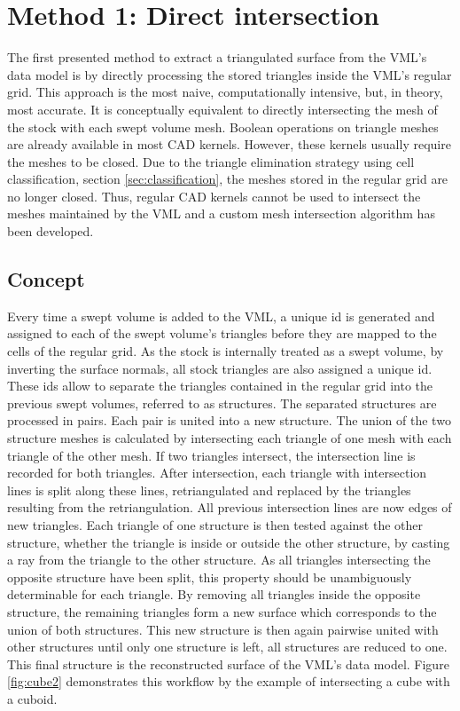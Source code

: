 
\chapter{Method 1: Direct intersection}
\label{ch:direct_intersection}

The first presented method to extract a triangulated surface from the VML's data model is by directly processing the stored triangles inside the VML's regular grid.
This approach is the most naive, computationally intensive, but, in theory, most accurate.
It is conceptually equivalent to directly intersecting the mesh of the stock with each swept volume mesh.
Boolean operations on triangle meshes are already available in most CAD kernels.
However, these kernels usually require the meshes to be closed.
Due to the triangle elimination strategy using cell classification, \cf section \ref{sec:classification}, the meshes stored in the regular grid are no longer closed.
Thus, regular CAD kernels cannot be used to intersect the meshes maintained by the VML and a custom mesh intersection algorithm has been developed.


\section{Concept}
\label{sec:direct_intersection_concept}

Every time a swept volume is added to the VML, a unique id is generated and assigned to each of the swept volume's triangles before they are mapped to the cells of the regular grid.
As the stock is internally treated as a swept volume, by inverting the surface normals, all stock triangles are also assigned a unique id.
These ids allow to separate the triangles contained in the regular grid into the previous swept volumes, referred to as structures.
The separated structures are processed in pairs.
Each pair is united into a new structure.
The union of the two structure meshes is calculated by intersecting each triangle of one mesh with each triangle of the other mesh.
If two triangles intersect, the intersection line is recorded for both triangles.
After intersection, each triangle with intersection lines is split along these lines, retriangulated and replaced by the triangles resulting from the retriangulation.
All previous intersection lines are now edges of new triangles.
Each triangle of one structure is then tested against the other structure, whether the triangle is inside or outside the other structure, \eg by casting a ray from the triangle to the other structure.
As all triangles intersecting the opposite structure have been split, this property should be unambiguously determinable for each triangle.
By removing all triangles inside the opposite structure, the remaining triangles form a new surface which corresponds to the union of both structures.
This new structure is then again pairwise united with other structures until only one structure is left, \ie all structures are reduced to one.
This final structure is the reconstructed surface of the VML's data model.
Figure \ref{fig:cube2} demonstrates this workflow by the example of intersecting a cube with a cuboid.

